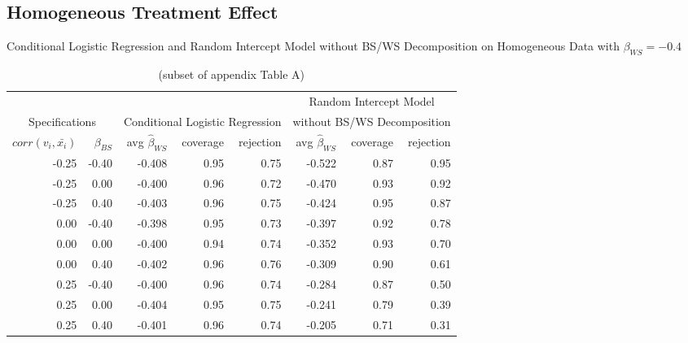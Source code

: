 \documentclass{article}
\begin{document}
    \subsection{Homogeneous Treatment Effect}
        \begin{table}[ht]
        \centering
        \caption{Conditional Logistic Regression and Random Intercept Model without BS/WS Decomposition on Homogeneous Data with $\beta_{WS} = -0.4$}
            \begin{tabular}{|r r || r r r | r r r| } %
                \hline
                \multicolumn{2}{|c||}{} & \multicolumn{3}{c|}{} & \multicolumn{3}{c|}{Random Intercept Model}\\ 
                \multicolumn{2}{|c||}{Specifications} & \multicolumn{3}{c|}{Conditional Logistic Regression} & \multicolumn{3}{c|}{without BS/WS Decomposition} \\
                \hline
                $corr(v_i,\bar{x_i})$ & $\beta_{BS}$ & avg $\hat{\beta}_{WS}$ & coverage & rejection & avg $\hat{\beta}_{WS}$ & coverage & rejection \\
                \hline 
                -0.25	&-0.40  &-0.408 &0.95 &0.75 &-0.522	&0.87	&0.95 \\
                -0.25	&0.00  	&-0.400 &0.96 &0.72 &-0.470	&0.93	&0.92 \\
                -0.25	&0.40  	&-0.403 &0.96 &0.75 &-0.424	&0.95	&0.87 \\
                0.00	&-0.40  &-0.398 &0.95 &0.73	&-0.397	&0.92	&0.78 \\
                0.00	&0.00  	&-0.400 &0.94 &0.74 &-0.352	&0.93	&0.70 \\
                0.00	&0.40  	&-0.402 &0.96 &0.76 &-0.309	&0.90	&0.61 \\
                0.25	&-0.40  &-0.400 &0.96 &0.74	&-0.284	&0.87	&0.50 \\
                0.25	&0.00  	&-0.404 &0.95 &0.75 &-0.241	&0.79	&0.39 \\
                0.25    &0.40   &-0.401 &0.96 &0.74 &-0.205 &0.71   &0.31 \\
                \hline
            \end{tabular}
        \caption*{(subset of appendix Table A)}    
    \end{table} 
\end{document}
